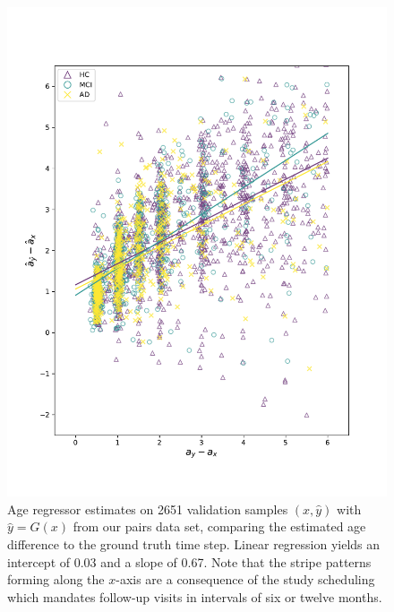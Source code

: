 \begin{figure}
	\centering
	\includegraphics[width=.7\linewidth]{images/age_plots/d_dhat_fake}
	\vspace*{-15pt}
	\caption{Age regressor estimates on 2651 validation samples $(x, \hat y)$ with $ \hat y = G(x) $ from our pairs data set, comparing the estimated age difference to the ground truth time step. Linear regression yields an intercept of 0.03 and a slope of 0.67. Note that the stripe patterns forming along the $x$-axis are a consequence of the study scheduling which mandates follow-up visits in intervals of six or twelve months.}
	\label{fig:regddhatfake}
\end{figure}


